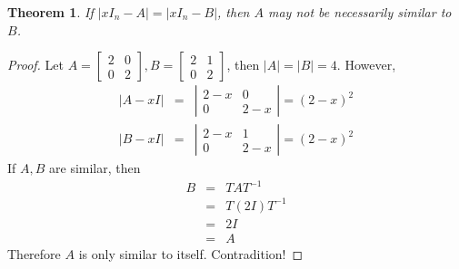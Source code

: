 \documentclass{article}
\theoremstyle{MyNonumberplain}
\theoremstyle{break}
\newtheorem*{proof}{Proof. }
\theoremstyle{break}
\newtheorem{theorem}{Theorem}[section]
\theoremstyle{break}
\theoremstyle{definition}
\theoremstyle{break}
\begin{document}
\begin{thmbox}
    \begin{theorem}
        If $| x I_n - A | = | x I_n - B |$, then $A$ may not be necessarily similar to
        $B$.
    \end{theorem}
    \begin{prfbox}
        \begin{proof}
            Let $A = \left[\begin{array}{cc}
                2 & 0\\
                0 & 2
              \end{array}\right], B = \left[\begin{array}{cc}
                2 & 1\\
                0 & 2
              \end{array}\right]$, then $| A | = | B | = 4$. However,
              \begin{eqnarray*}
                | A - x I | & = & \left|\begin{array}{cc}
                  2 - x & 0\\
                  0 & 2 - x
                \end{array}\right| = (2 - x)^2\\
                | B - x I | & = & \left|\begin{array}{cc}
                  2 - x & 1\\
                  0 & 2 - x
                \end{array}\right| = (2 - x)^2
              \end{eqnarray*}
              If $A, B$ are similar, then
              \begin{eqnarray*}
                B & = & T A T^{- 1}\\
                & = & T (2 I) T^{- 1}\\
                & = & 2 I\\
                & = & A
              \end{eqnarray*}
              Therefore $A$ is only similar to itself. Contradition!
        \end{proof}
    \end{prfbox}
\end{thmbox}
\end{document}
